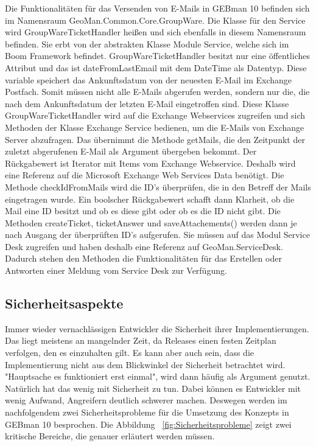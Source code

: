 \noindent
Die Funktionalitäten für das Versenden von E-Mails in GEBman 10 befinden sich im Namensraum GeoMan.Common.Core.GroupWare. Die Klasse für den Service wird GroupWareTicketHandler heißen und sich ebenfalls in diesem Namensraum befinden. Sie erbt von der abstrakten Klasse Module Service, welche sich im Boom Framework befindet. GroupWareTicketHandler besitzt nur eine öffentliches Attribut und das ist dateFromLastEmail mit dem DateTime als Datentyp. Diese variable speichert das Ankunftsdatum von der neuesten E-Mail im Exchange Postfach. Somit müssen nicht alle E-Mails abgerufen werden, sondern nur die, die nach dem Ankunftsdatum der letzten E-Mail eingetroffen sind.\newline
Diese Klasse GroupWareTicketHandler wird auf die Exchange Webservices zugreifen und sich Methoden der Klasse Exchange Service bedienen, um die E-Mails von Exchange Server abzufragen. Das übernimmt die Methode getMails, die den Zeitpunkt der zuletzt abgerufenen E-Mail als Argument übergeben bekommt. Der Rückgabewert ist Iterator mit Items vom Exchange Webservice. Deshalb wird eine Referenz auf die Microsoft Exchange Web Services Data benötigt.
\newline 
Die Methode checkIdFromMails wird die ID's überprüfen, die in den Betreff der Mails eingetragen wurde. Ein boolscher Rückgabewert schafft dann Klarheit, ob die Mail eine ID besitzt und ob es diese gibt oder ob es die ID nicht gibt. Die Methoden createTicket, ticketAnswer und saveAttachements() werden dann je nach Ausgang der überprüften ID's aufgerufen. Sie müssen auf das Modul Service Desk zugreifen und haben deshalb eine Referenz auf GeoMan.ServiceDesk. Dadurch stehen den Methoden die Funktionalitäten für das Erstellen oder Antworten einer Meldung vom Service Desk zur Verfügung.


\subsection{Sicherheitsaspekte}
\noindent
Immer wieder vernachlässigen Entwickler die Sicherheit ihrer Implementierungen. Das liegt meistens an mangelnder Zeit, da Releases einen festen Zeitplan verfolgen, den es einzuhalten gilt. Es kann aber auch sein, dass die Implementierung nicht aus dem Blickwinkel der Sicherheit betrachtet wird. "Hauptsache es funktioniert erst einmal", wird dann häufig als Argument genutzt. Natürlich hat das wenig mit Sicherheit zu tun. Dabei können es Entwickler mit wenig Aufwand, Angreifern deutlich schwerer machen. Deswegen werden im nachfolgendem zwei Sicherheitsprobleme für die Umsetzung des Konzepts in GEBman 10 besprochen. Die Abbildung ~\ref{fig:Sicherheitsprobleme} zeigt zwei kritische Bereiche, die genauer erläutert werden müssen.

